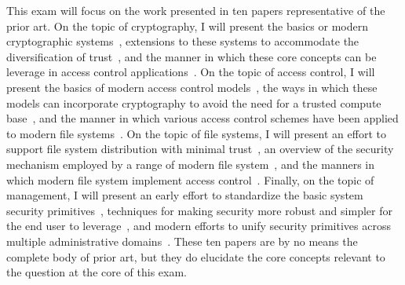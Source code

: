 \documentclass{sig-alternate}
\begin{document}
This exam will focus on the work presented in ten papers
representative of the prior art. On the topic of cryptography, I will
present the basics or modern cryptographic systems~\cite{Diffie1976},
extensions to these systems to accommodate the diversification of
trust~\cite{Shamir1979}, and the manner in which these core concepts
can be leverage in access control
applications~\cite{Bethencourt2007}. On the topic of access control, I
will present the basics of modern access control
models~\cite{Sandhu1996}, the ways in which these models can
incorporate cryptography to avoid the need for a trusted compute
base~\cite{Bethencourt2007}, and the manner in which various access
control schemes have been applied to modern file
systems~\cite{Miltchev2008}. On the topic of file systems, I will
present an effort to support file system distribution with minimal
trust~\cite{Mazieres1999}, an overview of the security mechanism
employed by a range of modern file system~\cite{Kher2005}, and the
manners in which modern file system implement access
control~\cite{Miltchev2008}. Finally, on the topic of management, I
will present an early effort to standardize the basic system security
primitives~\cite{Samar1996}, techniques for making security more
robust and simpler for the end user to leverage~\cite{Cox2002}, and
modern efforts to unify security primitives across multiple
administrative domains~\cite{Morgan2004}. These ten papers are by no
means the complete body of prior art, but they do elucidate the core
concepts relevant to the question at the core of this exam.



\end{document}
